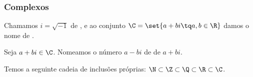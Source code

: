 \begin{frame}
\frametitle{Complexos} %
\begin{Def}
Chamamos $i = \sqrt {-1}$ de , e ao conjunto
$\C = \set{ a+bi \tq a,b \in \R}$ damos o nome de .
\end{Def}

Seja $a+bi \in \C$. Nomeamos o número $a-bi$ de  de
$a+bi$.

Temos a seguinte cadeia de inclusões próprias: $\N \subset \Z
\subset \Q \subset \R \subset \C$.
\end{frame}



